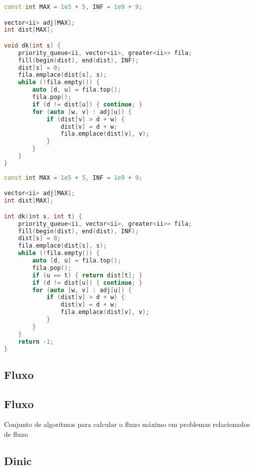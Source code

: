 \documentclass[11pt, a4paper, twoside]{article}
\begin{document}
\begin{multicols}{2}
\begin{lstlisting}[language=C++]
const int MAX = 1e5 + 5, INF = 1e9 + 9;

vector<ii> adj[MAX];
int dist[MAX];

void dk(int s) {
    priority_queue<ii, vector<ii>, greater<ii>> fila;
    fill(begin(dist), end(dist), INF);
    dist[s] = 0;
    fila.emplace(dist[s], s);
    while (!fila.empty()) {
        auto [d, u] = fila.top();
        fila.pop();
        if (d != dist[u]) { continue; }
        for (auto [w, v] : adj[u]) {
            if (dist[v] > d + w) {
                dist[v] = d + w;
                fila.emplace(dist[v], v);
            }
        }
    }
}
\end{lstlisting}
\end{multicols}

\begin{multicols}{2}
\begin{lstlisting}[language=C++]
const int MAX = 1e5 + 5, INF = 1e9 + 9;

vector<ii> adj[MAX];
int dist[MAX];

int dk(int s, int t) {
    priority_queue<ii, vector<ii>, greater<ii>> fila;
    fill(begin(dist), end(dist), INF);
    dist[s] = 0;
    fila.emplace(dist[s], s);
    while (!fila.empty()) {
        auto [d, u] = fila.top();
        fila.pop();
        if (u == t) { return dist[t]; }
        if (d != dist[u]) { continue; }
        for (auto [w, v] : adj[u]) {
            if (dist[v] > d + w) {
                dist[v] = d + w;
                fila.emplace(dist[v], v);
            }
        }
    }
    return -1;
}
\end{lstlisting}
\end{multicols}

\subsection{Fluxo}

\subsection{Fluxo}


Conjunto de algoritmos para calcular o fluxo máximo em problemas relacionados de fluxo

\subsection{Dinic}
\end{document}
